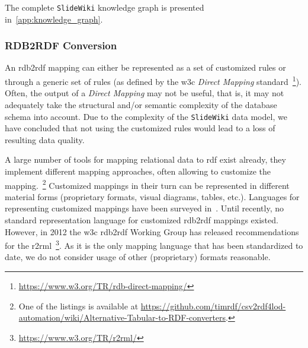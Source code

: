 \documentclass[PhD, Submit, ngerman,UKenglish,table]{scrbook}
\makeatletter
\newcommand{\todo}[1]{\textcolor{red}{@TODO: #1}}
\makeatother
\begin{document}
The complete \texttt{SlideWiki} knowledge graph is presented in~\autoref{app:knowledge_graph}.

\subsubsection{RDB2RDF Conversion}
\label{sec:RDB2RDF}
%

An \gls{rdb2rdf} mapping can either be represented as a set of customized rules or through a generic set of rules (as defined by the \gls{w3c} \emph{Direct Mapping} standard~\footnote{\url{https://www.w3.org/TR/rdb-direct-mapping/}}).
Often, the output of a \emph{Direct Mapping} may not be useful, that is, it may not adequately take the structural and/or semantic complexity of the database schema into account.
Due to the complexity of the \texttt{SlideWiki} data model, we have concluded that not using the customized rules would lead to a loss of resulting data quality. 

A large number of tools for mapping relational data to \gls{rdf} exist already, they implement different mapping approaches, often allowing to customize the mapping.~\footnote{One of the listings is available at \url{https://github.com/timrdf/csv2rdf4lod-automation/wiki/Alternative-Tabular-to-RDF-converters}.} Customized mappings in their turn can be represented in different material forms (proprietary formats, visual diagrams, tables, etc.).
Languages for representing customized mappings have been surveyed in~\cite{spanos2012bringing}.
Until recently, no standard representation language for customized \gls{rdb2rdf} mappings existed.
However, in 2012 the \gls{w3c} \gls{rdb2rdf} Working Group has released recommendations for the \gls{r2rml}~\footnote{\url{https://www.w3.org/TR/r2rml/}}.
As it is the only mapping language that has been standardized to date, we do not consider usage of other (proprietary) formats reasonable. 
\end{document}
